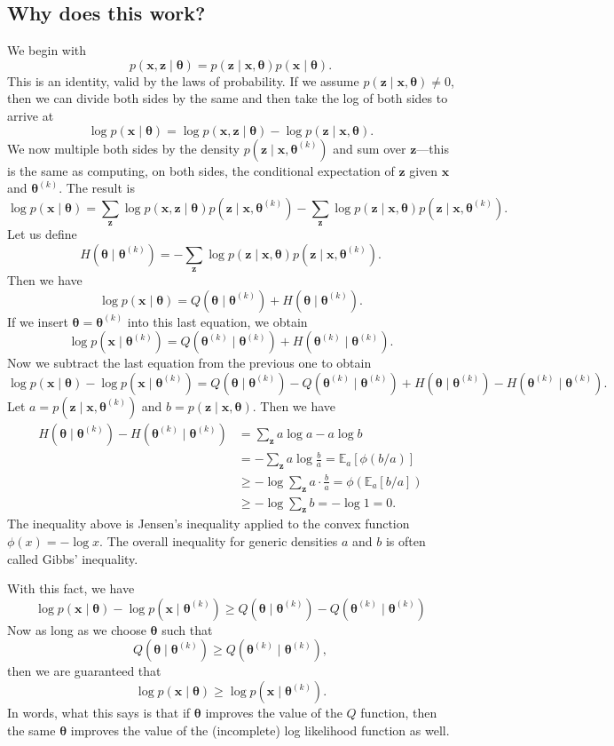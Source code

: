 \documentclass[12pt]{article}
\newcommand{\bx}{\ensuremath{\mathbf{x}}}
\newcommand{\bz}{\ensuremath{\mathbf{z}}}
\newcommand{\btheta}{\ensuremath{\boldsymbol{\theta}}}
\begin{document}
\subsection{Why does this work?}
\label{sect:why}
We begin with
$$
p(\bx, \bz \mid \btheta) = p(\bz \mid \bx, \btheta) p(\bx \mid \btheta).
$$
This is an identity, valid by the laws of probability.  If we assume 
$p(\bz \mid \bx, \btheta) \neq 0$, then we can divide both sides by the
same and then take the log of both sides to arrive at
$$
\log p(\bx \mid \btheta) = \log p(\bx, \bz \mid \btheta) - \log p(\bz \mid \bx, \btheta).
$$
We now multiple both sides by the density $p(\bz \mid \bx , \btheta^{(k)})$ and sum over $\bz$---this is the same as computing, on both sides, the conditional expectation of $\bz$ given $\bx$ and $\btheta^{(k)}$.  The result is
$$
\log p(\bx \mid \btheta) = \sum_{\bz} \log p(\bx, \bz \mid \btheta) p(\bz \mid \bx , \btheta^{(k)}) - \sum_{\bz} \log p(\bz \mid \bx, \btheta) p(\bz \mid \bx , \btheta^{(k)}).
$$
Let us define
$$
H(\btheta \mid \btheta^{(k)}) = - \sum_{\bz} \log p(\bz \mid \bx, \btheta) p(\bz \mid \bx , \btheta^{(k)}).
$$
Then we have
$$
\log p(\bx \mid \btheta) = Q(\btheta \mid \btheta^{(k)}) + H(\btheta \mid \btheta^{(k)}).
$$
If we insert $\btheta = \btheta^{(k)}$ into this last equation, we obtain
$$
\log p(\bx \mid \btheta^{(k)}) = Q(\btheta^{(k)} \mid \btheta^{(k)}) + H(\btheta^{(k)} \mid \btheta^{(k)}).
$$
Now we subtract the last equation from the previous one to obtain
$$
\log p(\bx \mid \btheta) - \log p(\bx \mid \btheta^{(k)}) = Q(\btheta \mid \btheta^{(k)}) - Q(\btheta^{(k)} \mid \btheta^{(k)}) + H(\btheta \mid \btheta^{(k)}) - H(\btheta^{(k)} \mid \btheta^{(k)}).
$$
Let $a = p(\bz \mid \bx, \btheta^{(k)})$ and $b = p(\bz \mid \bx, \btheta)$.  Then we have
\begin{align*}
H(\btheta \mid \btheta^{(k)}) - H(\btheta^{(k)} \mid \btheta^{(k)}) &= \sum_{\bz} a \log a - a \log b \\
 &= - \sum_{\bz} a \log \frac{b}{a} = \mathbb{E}_a[\phi(b/a)] \\
 &\geq -\log \sum_{\bz} a \cdot \frac{b}{a} = \phi(\mathbb{E}_a[b/a]) \\
 &\geq -\log \sum_{\bz} b = -\log 1 = 0.
\end{align*}
The inequality above is Jensen's inequality applied to the convex function $\phi(x) = -\log x$.  The overall inequality for generic densities $a$ and $b$ is often called Gibbs' inequality.

With this fact, we have
$$
\log p(\bx \mid \btheta) - \log p(\bx \mid \btheta^{(k)}) \geq Q(\btheta \mid \btheta^{(k)}) - Q(\btheta^{(k)} \mid \btheta^{(k)}) 
$$
Now as long as we choose $\btheta$ such that
$$
Q(\btheta \mid \btheta^{(k)}) \geq Q(\btheta^{(k)} \mid \btheta^{(k)}),
$$
then we are guaranteed that
$$
\log p(\bx \mid \btheta) \geq \log p(\bx \mid \btheta^{(k)}).
$$
In words, what this says is that if $\btheta$ improves the value of the $Q$ function, then the same $\btheta$ improves the value of the (incomplete) log likelihood function as well.
\end{document}
